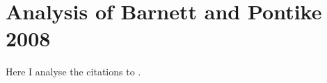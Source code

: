 \section{Analysis of Barnett and Pontike 2008}

Here I analyse the citations to \cite{barnett2008red}.\\

